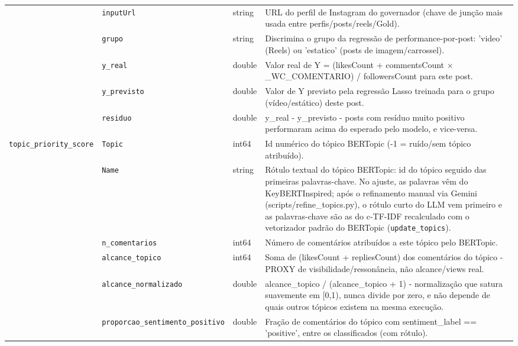 \begin{footnotesize}
\begin{longtable}{p{3.2cm}p{3.0cm}p{2.0cm}p{6.0cm}}
\texttt{} & \texttt{inputUrl} & string & URL do perfil de Instagram do governador (chave de junção mais usada entre perfis/\allowbreak{}posts/\allowbreak{}reels/\allowbreak{}Gold). \\
\texttt{} & \texttt{grupo} & string & Discrimina o grupo da regressão de performance-por-post: 'video' (Reels) ou 'estatico' (posts de imagem/\allowbreak{}carrossel). \\
\texttt{} & \texttt{y\_\allowbreak{}real} & double & Valor real de Y = (likesCount + commentsCount × \_\allowbreak{}WC\_\allowbreak{}COMENTARIO) /\allowbreak{} followersCount para este post. \\
\texttt{} & \texttt{y\_\allowbreak{}previsto} & double & Valor de Y previsto pela regressão Lasso treinada para o grupo (vídeo/\allowbreak{}estático) deste post. \\
\texttt{} & \texttt{residuo} & double & y\_\allowbreak{}real - y\_\allowbreak{}previsto - posts com resíduo muito positivo performaram acima do esperado pelo modelo, e vice-versa. \\
\texttt{topic\_\allowbreak{}priority\_\allowbreak{}score} & \texttt{Topic} & int64 & Id numérico do tópico BERTopic (-1 = ruído/\allowbreak{}sem tópico atribuído). \\
\texttt{} & \texttt{Name} & string & Rótulo textual do tópico BERTopic: id do tópico seguido das primeiras palavras-chave. No ajuste, as palavras vêm do KeyBERTInspired; após o refinamento manual via Gemini (scripts/\allowbreak{}refine\_\allowbreak{}topics.py), o rótulo curto do LLM vem primeiro e as palavras-chave são as do c-TF-IDF recalculado com o vetorizador padrão do BERTopic (\texttt{update\_\allowbreak{}topics}). \\
\texttt{} & \texttt{n\_\allowbreak{}comentarios} & int64 & Número de comentários atribuídos a este tópico pelo BERTopic. \\
\texttt{} & \texttt{alcance\_\allowbreak{}topico} & int64 & Soma de (likesCount + repliesCount) dos comentários do tópico - PROXY de visibilidade/\allowbreak{}ressonância, não alcance/\allowbreak{}views real. \\
\texttt{} & \texttt{alcance\_\allowbreak{}normalizado} & double & alcance\_\allowbreak{}topico /\allowbreak{} (alcance\_\allowbreak{}topico + 1) - normalização que satura suavemente em [0,1), nunca divide por zero, e não depende de quais outros tópicos existem na mesma execução. \\
\texttt{} & \texttt{proporcao\_\allowbreak{}sentimento\_\allowbreak{}positivo} & double & Fração de comentários do tópico com sentiment\_\allowbreak{}label == 'positive', entre os classificados (com rótulo). \\

\end{longtable}
\end{footnotesize}
